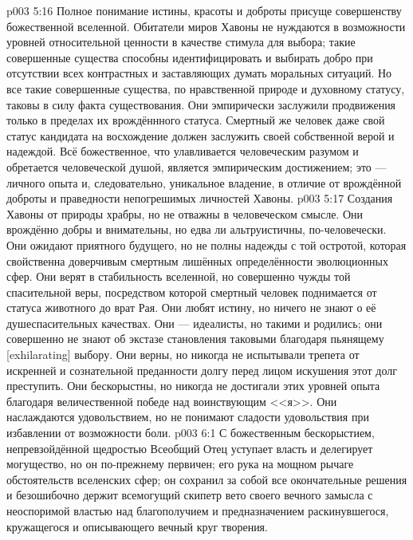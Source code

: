 \vs p003 5:16 \pc Полное понимание истины, красоты и доброты присуще совершенству божественной вселенной. Обитатели миров Хавоны не нуждаются в возможности уровней относительной ценности в качестве стимула для выбора; такие совершенные существа способны идентифицировать и выбирать добро при отсутствии всех контрастных и заставляющих думать моральных ситуаций. Но все такие совершенные существа, по нравственной природе и духовному статусу, таковы в силу факта существования. Они эмпирически заслужили продвижения только в пределах их врождённного статуса. Смертный же человек даже свой статус кандидата на восхождение должен заслужить своей собственной верой и надеждой. Всё божественное, что улавливается человеческим разумом и обретается человеческой душой, является эмпирическим достижением; это ---  личного опыта и, следовательно, уникальное владение, в отличие от врождённой доброты и праведности непогрешимых личностей Хавоны.
\vs p003 5:17 \pc Создания Хавоны от природы храбры, но не отважны в человеческом смысле. Они врождённо добры и внимательны, но едва ли альтруистичны, по\hyp{}человечески. Они ожидают приятного будущего, но не полны надежды с той остротой, которая свойственна доверчивым смертным лишённых определённости эволюционных сфер. Они верят в стабильность вселенной, но совершенно чужды той спасительной веры, посредством которой смертный человек поднимается от статуса животного до врат Рая. Они любят истину, но ничего не знают о её душеспасительных качествах. Они --- идеалисты, но такими и родились; они совершенно не знают об экстазе становления таковыми благодаря пьянящему [exhilarating] выбору. Они верны, но никогда не испытывали трепета от искренней и сознательной преданности долгу перед лицом искушения этот долг преступить. Они бескорыстны, но никогда не достигали этих уровней опыта благодаря величественной победе над воинствующим <<я>>. Они наслаждаются удовольствием, но не понимают сладости удовольствия при избавлении от возможности боли.
\vs p003 6:1 С божественным бескорыстием, непревзойдённой щедростью Всеобщий Отец уступает власть и делегирует могущество, но он по\hyp{}прежнему первичен; его рука на мощном рычаге обстоятельств вселенских сфер; он сохранил за собой все окончательные решения и безошибочно держит всемогущий скипетр вето своего вечного замысла с неоспоримой властью над благополучием и предназначением раскинувшегося, кружащегося и описывающего вечный круг творения.
